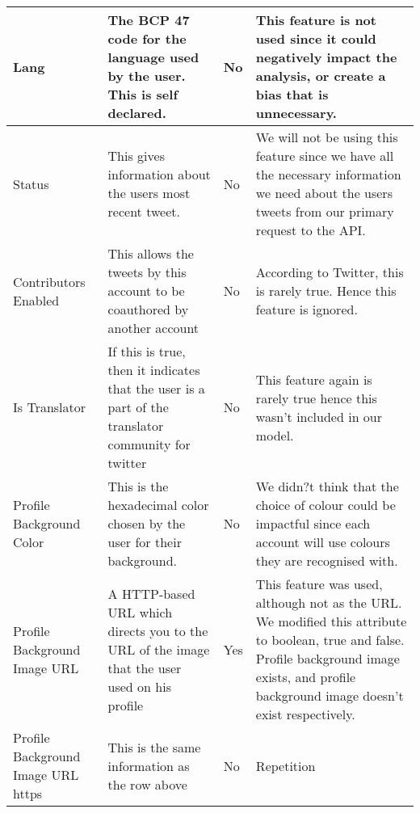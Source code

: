 \begin{landscape}
\begin{longtable}{|C{1.00in}|C{2.50in}|C{.60in}|C{5.00in}|}
\hline    
Lang                               & The BCP 47 code for the language used by the user. This is self declared.  & No          & This feature is not used since it could negatively impact the analysis, or create a bias that is unnecessary.                                                                                    \\
\hline    
Status                             & This gives information about the users most recent tweet.                                                                      & No          & We will not be using this feature since we have all the necessary information we need about the users tweets from our primary request to the API.                                                \\
\hline    
Contributors Enabled               & This allows the tweets by this account to be coauthored by another account                                                     & No          & According to Twitter, this is rarely true. Hence this feature is ignored.                                                                                                                        \\
\hline    
Is Translator                      & If this is true, then it indicates that the user is a part of the translator community for twitter                             & No          & This feature again is rarely true hence this wasn't included in our model.                                                                                                                       \\
\hline    
Profile Background Color           & This is the hexadecimal color chosen by the user for their background.                                                         & No          & We didn?t think that the choice of colour could be impactful since each account will use colours they are recognised with.                                                                       \\
\hline    
Profile Background Image URL       & A HTTP-based URL which directs you to the URL of the image that the user used on his profile                                   & Yes         & This feature was used, although not as the URL. We modified this attribute to boolean, true and false. Profile background image exists, and profile background image doesn't exist 
respectively. \\
\hline    
Profile Background Image URL https & This is the same information as the row above                                                                                  & No          & Repetition                                                                                                                                                                                       \\

\end{longtable}
\end{landscape}
